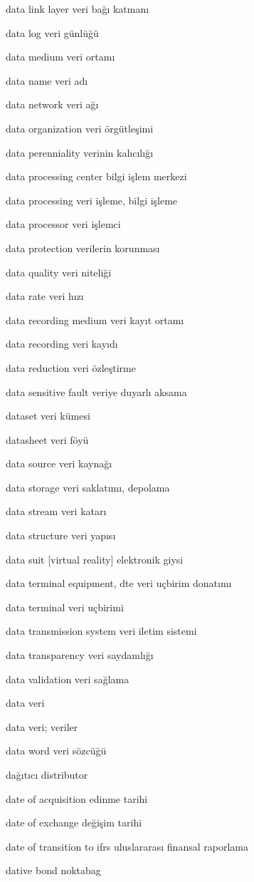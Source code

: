 \documentclass[12pt,fleqn]{article}\usepackage{../../common}
\begin{document}
data link layer veri bağı katmanı

data log veri günlüğü

data medium veri ortamı

data name veri adı

data network veri ağı

data organization veri örgütleşimi

data perenniality verinin kalıcılığı

data processing center bilgi işlem merkezi

data processing veri işleme, bilgi işleme

data processor veri işlemci

data protection verilerin korunması

data quality veri niteliği

data rate veri hızı

data recording medium veri kayıt ortamı

data recording veri kayıdı

data reduction veri özleştirme

data sensitive fault veriye duyarlı aksama

dataset veri kümesi

datasheet veri föyü

data source veri kaynağı

data storage veri saklatımı, depolama

data stream veri katarı

data structure veri yapısı

data suit [virtual reality] elektronik giysi

data terminal equipment, dte veri uçbirim donatımı

data terminal veri uçbirimi

data transmission system veri iletim sistemi

data transparency veri saydamlığı

data validation veri sağlama

data veri

data veri; veriler

data word veri sözcüğü

dağıtıcı distributor

date of acquisition edinme tarihi

date of exchange değişim tarihi

date of transition to ifrs uluslararası finansal raporlama

dative bond noktabag
\end{document}
